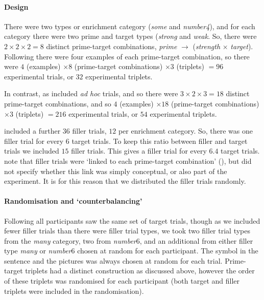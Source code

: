 \documentclass[10pt]{article}
\begin{document}
\begin{multicols}{2}
\paragraph{Design}
There were two types or enrichment category (\emph{some} and \emph{number4}), and for each category there were two prime and target types (\emph{strong} and \emph{weak}.
So, there were \(2 \times 2 \times 2 = 8\) distinct prime-target combinations, \emph{prime} \(\rightarrow\) (\emph{strength} \(\times\) \emph{target}).
Following \citeauthor{Bott:2016aa} there were four examples of each prime-target combination, so there were \(4\) (examples) \(\times 8\) (prime-target combinations) \(\times 3\) (triplets) \(= 96\) experimental trials, or \(32\) experimental triplets.

In contrast, as \citeauthor{Bott:2016aa} included \emph{ad hoc} trials, and so there were \(3 \times 2 \times 3 = 18\) distinct prime-target combinations, and so  \(4\) (examples) \(\times 18\) (prime-target combinations) \(\times 3\) (triplets) \(= 216\) experimental trials, or \(54\) experimental triplets.

\citeauthor{Bott:2016aa} included a further \(36\) filler trials, \(12\) per enrichment category.
So, there was one filler trial for every \(6\) target trials.
To keep this ratio between filler and target trials we included \(15\) filler trials.
This gives a filler trial for every \(6.4\) target trials.
\citeauthor{Bott:2016aa} note that filler trials were `linked to each prime-target combination' (\citeyear[123]{Bott:2016aa}), but did not specify whether this link was simply conceptual, or also part of the experiment.
It is for this reason that we distributed the filler trials randomly.

\paragraph{Randomisation and `counterbalancing'}

Following \citeauthor{Bott:2016aa} all participants saw the same set of target trials, though as we included fewer filler trials than there were filler trial types, we took two filler trial types from the \emph{many} category, two from \emph{number\(6\)}, and an additional from either filler type \emph{many} or \emph{number\(6\)} chosen at random for each participant.
The symbol in the sentence and the pictures was always chosen at random for each trial.
Prime-target triplets had a distinct construction as discussed above, however the order of these triplets was randomised for each participant (both target and filler triplets were included in the randomisation).


\end{multicols}
\end{document}
